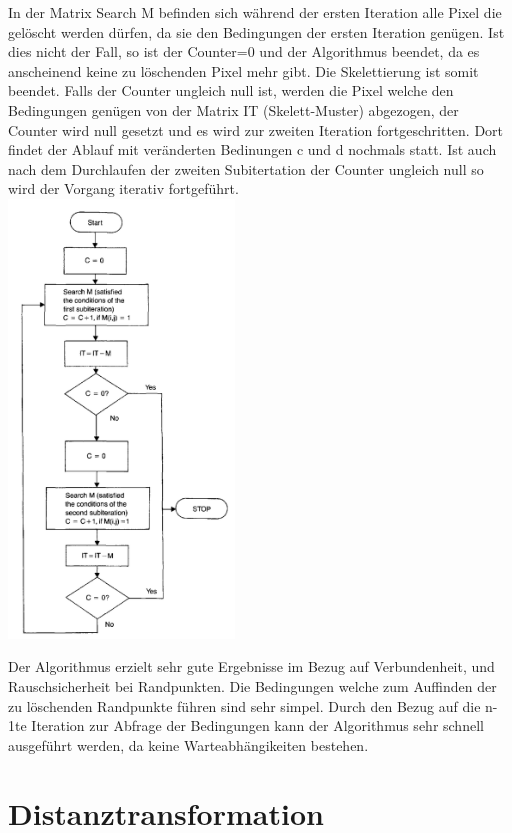 \documentclass[appendixprefix,a4paper,bibliography=totoc,twoside=true,11pt,DIV=11,BCOR=6mm,headsepline,pointlessnumbers]{scrbook}
\begin{document}
In der Matrix Search M befinden sich während der ersten Iteration alle Pixel die gelöscht werden dürfen, da sie den Bedingungen der ersten Iteration genügen. Ist dies nicht der Fall, so ist der Counter=0 und der Algorithmus beendet, da es anscheinend keine zu löschenden Pixel mehr gibt. Die Skelettierung ist somit beendet.
Falls der Counter ungleich null ist, werden die Pixel welche den Bedingungen genügen von der Matrix IT (Skelett-Muster) abgezogen, der Counter wird null gesetzt und es wird zur zweiten Iteration fortgeschritten. Dort findet der Ablauf mit veränderten Bedinungen c und d nochmals statt. Ist auch nach dem Durchlaufen der zweiten Subitertation der Counter ungleich null so wird der Vorgang iterativ fortgeführt.\\




\includegraphics[width=6cm]{Res/AlgUebersicht.png}


Der Algorithmus erzielt sehr gute Ergebnisse im Bezug auf Verbundenheit, und Rauschsicherheit bei Randpunkten. Die Bedingungen welche zum Auffinden der zu löschenden Randpunkte führen sind sehr simpel. Durch den Bezug auf die n-1te Iteration zur Abfrage der Bedingungen kann der Algorithmus sehr schnell ausgeführt werden, da keine Warteabhängikeiten bestehen.

\section{Distanztransformation}
\end{document}
